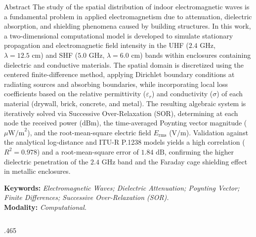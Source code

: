 \documentclass[final]{beamer}
\begin{document}
\begin{frame}[t]
		\begin{block}{Abstract}
			The study of the spatial distribution of indoor electromagnetic waves is a fundamental problem in applied electromagnetism due to attenuation, dielectric absorption, and shielding phenomena caused by building structures. In this work, a two-dimensional computational model is developed to simulate stationary propagation and electromagnetic field intensity in the UHF (\(2.4\text{ GHz}\), \(\lambda = 12.5\text{ cm}\)) and SHF (\(5.0\text{ GHz}\), \(\lambda = 6.0\text{ cm}\)) bands within enclosures containing dielectric and conductive materials. The spatial domain is discretized using the centered finite-difference method, applying Dirichlet boundary conditions at radiating sources and absorbing boundaries, while incorporating local loss coefficients based on the relative permittivity (\(\varepsilon_r\)) and conductivity (\(\sigma\)) of each material (drywall, brick, concrete, and metal). The resulting algebraic system is iteratively solved via Successive Over-Relaxation (SOR), determining at each node the received power (\(\text{dBm}\)), the time-averaged Poynting vector magnitude (\(\mu\text{W/m}^2\)), and the root-mean-square electric field \(E_{\text{rms}}\) (\(\text{V/m}\)). Validation against the analytical log-distance and ITU-R P.1238 models yields a high correlation (\(R^2 = 0.978\)) and a root-mean-square error of \(1.84\text{ dB}\), confirming the higher dielectric penetration of the \(2.4\text{ GHz}\) band and the Faraday cage shielding effect in metallic enclosures.
			
			\vspace{0.25cm}
			\textbf{Keywords:} \textit{Electromagnetic Waves; Dielectric Attenuation; Poynting Vector; Finite Differences; Successive Over-Relaxation (SOR).}\\
			\textbf{Modality:} \textit{Computational.}
		\end{block}
		
		\vspace{0.3cm}
		
		\begin{columns}[t]
			
			\begin{column}{.465\paperwidth}
				

\end{column}
\end{columns}
\end{frame}
\end{document}
